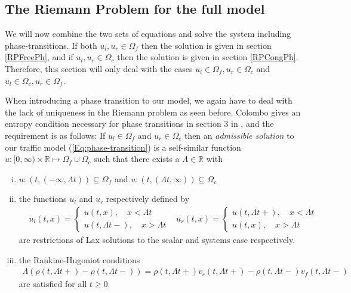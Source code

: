 \documentclass[10pt]{article}
\numberwithin{equation}{section}
\begin{document}
\newpage
\subsection{The Riemann Problem for the full model}
We will now combine the two sets of equations and solve the system including phase-transitions. If both $u_l, u_r \in \Omega_f$ then the solution is given in section \ref{RPFreePh}, and if $u_l, u_r \in \Omega_c$ then the solution is given in section \ref{RPCongPh}. Therefore, this section will only deal with the cases $u_l \in \Omega_f, u_r \in \Omega_c$ and $u_l \in \Omega_c, u_r \in \Omega_f$.

When introducing a phase transition to our model, we again have to deal with the lack of uniqueness in the Riemann problem as seen before. Colombo gives an entropy condition necessary for phase transitions in section 3 in \cite{Colombo2003}, and the requirement is as follows: If $u_l \in \Omega_f$ and $u_r \in \Omega_c$ then an \textit{admissible solution} to our traffic model (\ref{Eq:phase-transition}) is a self-similar function $u:[0, \infty) \times \mathbb{R} \mapsto \Omega_f \cup \Omega_c$ such that there exists a $\Lambda \in \mathbb{R}$ with 
\begin{enumerate}[i)]
    \item $u:(t, (-\infty,\Lambda t)) \subseteq \Omega_f $ and $u:(t, (\Lambda t, \infty)) \subseteq \Omega_c $ 
    \item the functions $u_l$ and $u_r$ respectively defined by \begin{align*}
        & u_l(t,x) = \begin{cases}
        u(t,x),  \quad x < \Lambda t\\
        u(t,\Lambda t-),\quad x > \Lambda t
        \end{cases}
        & u_r(t,x) = \begin{cases}
        u(t,\Lambda t+), \quad x < \Lambda t\\
        u(t,x), \quad x > \Lambda t
        \end{cases}
    \end{align*} are restrictions of Lax solutions to the scalar and systems case respectively. 
    \item the Rankine-Hugoniot conditions 
    \begin{align}
        \Lambda (\rho (t,\Lambda t+) - \rho (t,\Lambda t-)) = \rho (t,\Lambda t+) v_c(t,\Lambda t+) - \rho (t,\Lambda t-) v_f(t,\Lambda t-)
        \label{Eq:RH_PhT}
    \end{align} are satisfied for all $t \geq 0$.
\end{enumerate}
\end{document}
